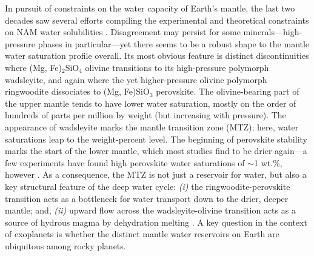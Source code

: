In pursuit of constraints on the water capacity of Earth's mantle, the last two decades saw several efforts compiling the experimental and theoretical constraints on NAM water solubilities \citep[e.g.,][]{keppler_thermodynamics_2006, ohtani_hydrous_2015, demouchy_distribution_2016, tikoo_fate_2017, dong_constraining_2021, andrault_mantle_2022}. Disagreement may persist for some minerals---high-pressure phases in particular---yet there seems to be a robust shape to the mantle water saturation profile overall. Its most obvious feature is distinct discontinuities where (Mg, Fe)$_2$SiO$_4$ olivine transitions to its high-pressure polymorph wadsleyite, and again where the yet higher-pressure olivine polymorph ringwoodite dissociates to (Mg, Fe)SiO$_3$ perovskite. The olivine-bearing part of the upper mantle tends to have lower water saturation, mostly on the order of hundreds of parts per million by weight (but increasing with pressure). The appearance of wadsleyite marks the mantle transition zone (MTZ); here, water saturations leap to the weight-percent level. The beginning of perovskite stability marks the start of the lower mantle, which most studies find to be drier again---a few experiments have found high perovskite water saturations of $\sim$1 wt.\%, however \citep{murakami_water_2002, fu_water_2019}. As a consequence, the MTZ is not just a reservoir for water, but also a key structural feature of the deep water cycle: \textit{(i)} the ringwoodite-perovskite transition acts as a bottleneck for water transport down to the drier, deeper mantle; and, \textit{(ii)} upward flow across the wadsleyite-olivine transition acts as a source of hydrous magma by dehydration melting \citep{bercovici_wholemantle_2003, andrault_mantle_2022}. A key question in the context of exoplanets is whether the distinct mantle water reservoirs on Earth are ubiquitous among rocky planets.

